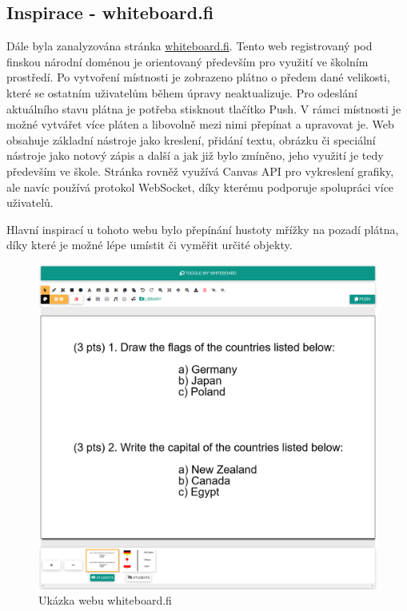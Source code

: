 \subsection{Inspirace - whiteboard.fi}
\label{sec:2.3}
Dále byla zanalyzována stránka \underline{whiteboard.fi}.
Tento web registrovaný pod finskou národní doménou je orientovaný především pro využití ve školním prostředí.
Po vytvoření místnosti je zobrazeno plátno o předem dané velikosti, které se ostatním uživatelům během úpravy neaktualizuje.
Pro odeslání aktuálního stavu plátna je potřeba stisknout tlačítko Push.
V rámci místnosti je možné vytvářet více pláten a libovolně mezi nimi přepínat a upravovat je.
Web obsahuje základní nástroje jako kreslení, přidání textu, obrázku či speciální nástroje jako notový zápis a další a jak již bylo zmíněno, jeho využití je tedy především ve škole.
Stránka rovněž využívá Canvas API pro vykreslení grafiky, ale navíc používá protokol WebSocket, díky kterému podporuje spolupráci více uživatelů.

Hlavní inspirací u tohoto webu bylo přepínání hustoty mřížky na pozadí plátna, díky které je možné lépe umístit či vyměřit určité objekty.
\begin{figure}[h!]
	\centering
	\includegraphics[width=1\textwidth]{Figures/whiteboard.png}
	\caption{Ukázka webu whiteboard.fi}
	\label{fig:whiteboard}
\end{figure}



